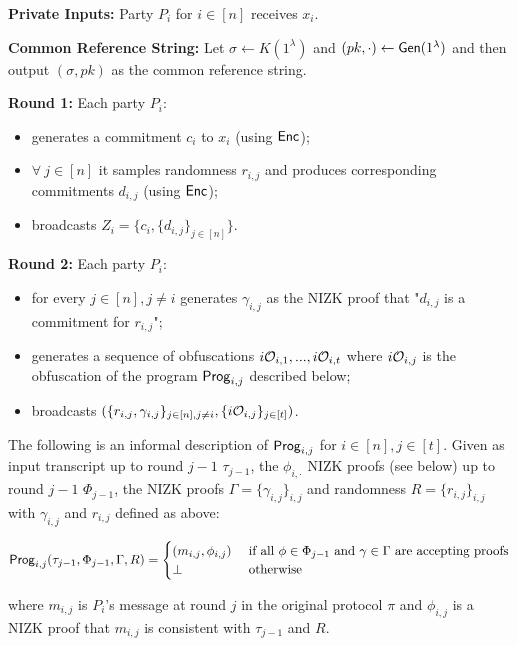 \noindent
\textbf{Private Inputs:} Party $P_i$ for $i \in [n]$ receives $x_i$.

\noindent
\textbf{Common Reference String:} Let $\sigma \gets K(1^{\lambda})$ and $(pk, \cdot) \gets \mathsf{Gen}(1^{\lambda})$ and then output $(\sigma, pk)$ as the common reference string.

\noindent
\textbf{Round 1:} Each party $P_i$:
\begin{itemize}
	\item generates a commitment $c_i$ to $x_i$ (using $\mathsf{Enc}$);
	\item $\forall\ j \in [n]$ it samples randomness $r_{i,j}$ and produces corresponding commitments $d_{i,j}$ (using $\mathsf{Enc}$);
	\item broadcasts $Z_i = \{c_i, \{ d_{i,j} \}_{j \in [n]}  \}$.
\end{itemize}

\noindent
\textbf{Round 2:} Each party $P_i$:
\begin{itemize}
	\item for every $j \in [n], j \not = i$ generates $\gamma_{i,j}$ as the NIZK proof that "$d_{i,j}$ is a commitment for $r_{i,j}$";
	\item generates a sequence of obfuscations $i\mathcal{O}_{i,1},...,i\mathcal{O}_{i,t}$ where $i\mathcal{O}_{i,j}$ is the obfuscation of the program $\mathsf{Prog}_{i,j}$ described below;
	\item broadcasts $( \{ r_{i,j}, \gamma_{i,j} \}_{j \in [n], j \not = i}, \{ i\mathcal{O}_{i,j} \}_{j \in [t]})$.
\end{itemize}

The following is an informal description of $\mathsf{Prog}_{i,j}$ for $i \in [n], j \in [t]$.
Given as input transcript up to round $j-1$ $\tau_{j-1}$, the $\phi_{i,\cdot}$ NIZK proofs (see below) up to round $j-1$ $\Phi_{j-1}$, the NIZK proofs $\Gamma = \{ \gamma_{i,j} \}_{i,j}$ and randomness $R = \{ r_{i,j} \}_{i,j}$ with $\gamma_{i,j}$ and $r_{i,j}$ defined as above:

\[
\Prog_{i,j}(\tau_{j-1}, \Phi_{j-1}, \Gamma, R) =
\begin{cases} 
\hfill (m_{i,j}, \phi_{i,j})    \hfill & \text{ if all $\phi \in \Phi_{j-1}$ and $\gamma \in \Gamma$ are accepting proofs} \\
\bot \hfill & \text{ otherwise } \\
\end{cases}
\]

where $m_{i,j}$ is $P_i$'s message at round $j$ in the original protocol $\pi$ and $\phi_{i,j}$ is a NIZK proof that $m_{i,j}$ is consistent with $\tau_{j-1}$ and $R$.

